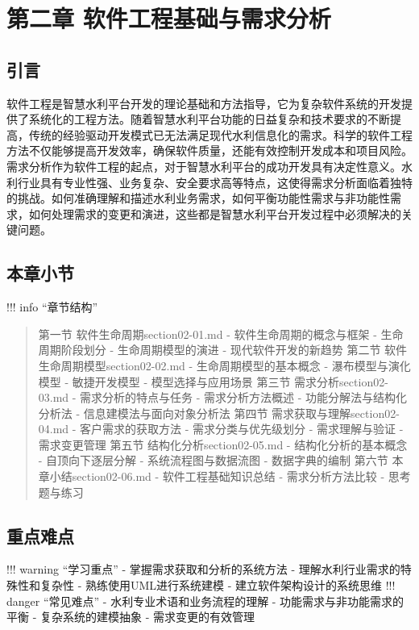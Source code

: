 \section{第二章 软件工程基础与需求分析}\label{ux7b2cux4e8cux7ae0-ux8f6fux4ef6ux5de5ux7a0bux57faux7840ux4e0eux9700ux6c42ux5206ux6790}
\learningobjectives{ }\subsection{引言}\label{ux5f15ux8a00}
软件工程是智慧水利平台开发的理论基础和方法指导，它为复杂软件系统的开发提供了系统化的工程方法。随着智慧水利平台功能的日益复杂和技术要求的不断提高，传统的经验驱动开发模式已无法满足现代水利信息化的需求。科学的软件工程方法不仅能够提高开发效率，确保软件质量，还能有效控制开发成本和项目风险。
需求分析作为软件工程的起点，对于智慧水利平台的成功开发具有决定性意义。水利行业具有专业性强、业务复杂、安全要求高等特点，这使得需求分析面临着独特的挑战。如何准确理解和描述水利业务需求，如何平衡功能性需求与非功能性需求，如何处理需求的变更和演进，这些都是智慧水利平台开发过程中必须解决的关键问题。
\subsection{本章小节}\label{ux672cux7ae0ux5c0fux8282} !!! info ``章节结构'' \begin{quote}
 第一节 软件生命周期section02-01.md -
软件生命周期的概念与框架 - 生命周期阶段划分 - 生命周期模型的演进 - 现代软件开发的新趋势 第二节 软件生命周期模型section02-02.md - 生命周期模型的基本概念 - 瀑布模型与演化模型 - 敏捷开发模型 -
模型选择与应用场景 第三节 需求分析section02-03.md - 需求分析的特点与任务 - 需求分析方法概述 - 功能分解法与结构化分析法 - 信息建模法与面向对象分析法 第四节
需求获取与理解section02-04.md - 客户需求的获取方法 - 需求分类与优先级划分 - 需求理解与验证 - 需求变更管理 第五节 结构化分析section02-05.md - 结构化分析的基本概念 -
自顶向下逐层分解 - 系统流程图与数据流图 - 数据字典的编制 第六节 本章小结section02-06.md - 软件工程基础知识总结 - 需求分析方法比较 - 思考题与练习 
\end{quote} \keypoints{
}\subsection{重点难点}\label{ux91cdux70b9ux96beux70b9} !!! warning ``学习重点'' - 掌握需求获取和分析的系统方法 - 理解水利行业需求的特殊性和复杂性 -
熟练使用UML进行系统建模 - 建立软件架构设计的系统思维 !!! danger ``常见难点'' - 水利专业术语和业务流程的理解 - 功能需求与非功能需求的平衡 - 复杂系统的建模抽象 - 需求变更的有效管理
